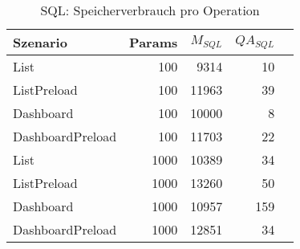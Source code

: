 
\begin{table}[ht]
\centering
\caption{SQL: Speicherverbrauch pro Operation}
\begin{tabular}{lrrrr}
\toprule
Szenario & Params & ${M_{SQL}}$ & ${QA_{SQL}}$  \\
\midrule

	List & 100 & 9314 & 10 \\
	ListPreload & 100 & 11963 & 39 \\
	Dashboard & 100 & 10000 & 8 \\
	DashboardPreload & 100 & 11703 & 22 \\
	List & 1000 & 10389 & 34 \\
	ListPreload & 1000 & 13260 & 50 \\
	Dashboard & 1000 & 10957 & 159 \\
	DashboardPreload & 1000 & 12851 & 34 \\
\bottomrule
\end{tabular}
\label{tab:benchmark_sql_bytesperop}
\end{table}
	